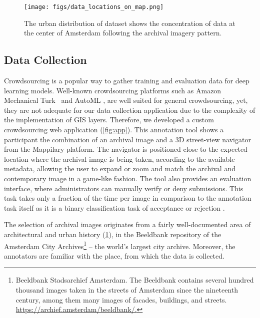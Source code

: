 \documentclass[a4paper,conference]{IEEEtran}
\begin{document}
\begin{figure}
\begin{center}
\texttt{[image: figs/data\_locations\_on\_map.png]}
\end{center}
\caption{The urban distribution of \amstertime dataset shows the concentration of data at the center of Amsterdam following the archival imagery pattern.}
\label{fig:AmsterMap}
\end{figure}

\subsection{Data Collection}

Crowdsourcing is a popular way to gather training and evaluation data for deep learning models. Well-known crowdsourcing platforms such as Amazon Mechanical Turk~\cite{crowston2012amazon} and AutoML \cite{AutoML}, are well suited for general crowdsourcing, yet, they are not adequate for our data collection application due to the complexity of the implementation of GIS layers. Therefore, we developed a custom crowdsourcing web application (\cref{fig:app}).
This annotation tool shows a participant the combination of an archival image and a 3D street-view navigator from the Mappilary platform. The navigator is positioned close to the expected location where the archival image is being taken, according to the available metadata, allowing the user to expand or zoom and match the archival and contemporary image in a game-like fashion. The tool also provides an evaluation interface, where administrators can manually verify or deny submissions. This task takes only a fraction of the time per image in comparison to the annotation task itself as it is a binary classification task of acceptance or rejection \cite{ArchiMediaL}. 

The selection of archival images originates from a fairly well-documented area of architectural and urban history (\cref{fig:AmsterMap}), in the Beeldbank repository of the Amsterdam City Archives\footnote{Beeldbank Stadsarchief Amsterdam. The Beeldbank contains several hundred thousand images taken in the streets of Amsterdam since the nineteenth century, among them many images of facades, buildings, and streets.   \url{https://archief.amsterdam/beeldbank/.}} – the world’s largest city archive. Moreover, the annotators are familiar with the place, from which the data is collected. 
\end{document}
